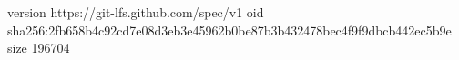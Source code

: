 version https://git-lfs.github.com/spec/v1
oid sha256:2fb658b4c92cd7e08d3eb3e45962b0be87b3b432478bec4f9f9dbcb442ec5b9e
size 196704
